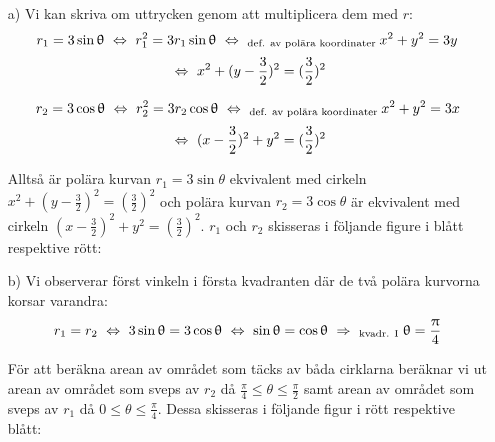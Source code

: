 \documentclass{article}
\begin{document}
\begin{enumerate}
    \item[a)] Vi kan skriva om uttrycken genom att multiplicera dem med $r$:
        $$
        r_1=3\mathop\mathrm{sin}\nolimits\uptheta 
        \ \Leftrightarrow \ 
        r_{1}^2=3r_{1}\mathop\mathrm{sin}\nolimits\uptheta
        \ \Leftrightarrow \ _{\text{def. av polära koordinater}}
        \:
        x^2+y^2=3y
        $$
        $$
        \ \Leftrightarrow \ 
        x^2+(y-\frac{3}{2})^2=(\frac{3}{2})^2
        $$

        $$
        r_2=3\mathop\mathrm{cos}\nolimits\uptheta 
        \ \Leftrightarrow \ 
        r_{2}^2=3r_{2}\mathop\mathrm{cos}\nolimits\uptheta
        \ \Leftrightarrow \ _{\text{def. av polära koordinater}}
        \:
        x^2+y^2=3x
        $$
        $$
        \ \Leftrightarrow \ 
        (x-\frac{3}{2})^2+y^2=(\frac{3}{2})^2
        $$

        \vskip 0.3cm

        Alltså är polära kurvan $r_{1}=3\sin\theta$ ekvivalent med cirkeln $x^2+(y-\frac{3}{2})^2=(\frac{3}{2})^2$ och polära kurvan $r_{2}=3\cos\theta$ är ekvivalent med cirkeln $(x-\frac{3}{2})^2+y^2=(\frac{3}{2})^2$. $r_{1}$ och $r_{2}$ skisseras i följande figure i blått respektive rött:

        \begin{figure}[h]
            \center
        \end{figure}

    \item[b)] Vi observerar först vinkeln i första kvadranten där de två polära kurvorna korsar varandra:
        $$
        r_{1}=r_{2}
        \ \Leftrightarrow \ 
        3\mathop\mathrm{sin}\nolimits\uptheta=3\mathop\mathrm{cos}\nolimits\uptheta
        \ \Leftrightarrow \ 
        \mathop\mathrm{sin}\nolimits\uptheta=\mathop\mathrm{cos}\nolimits\uptheta
        \ \Rightarrow \ _{\text{kvadr. I}}
        \;
        \uptheta=\frac{\uppi}{4}
        $$

        För att beräkna arean av området som täcks av båda cirklarna beräknar vi ut arean av området som sveps av $r_{2}$ då $\frac{\pi}{4}\leq\theta\leq\frac{\pi}{2}$ samt arean av området som sveps av $r_{1}$ då $0\leq\theta\leq\frac{\pi}{4}$. Dessa skisseras i följande figur i rött respektive blått:


\end{enumerate}
\end{document}
